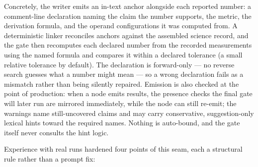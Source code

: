 Concretely, the writer emits an in-text anchor alongside each
reported number: a comment-line declaration naming the claim the
number supports, the metric, the derivation formula, and the operand
configurations it was computed from. A deterministic linker
reconciles anchors against the assembled science record, and the
gate then recomputes each declared number from the recorded
measurements using the named formula and compares it within a
declared tolerance (a small relative tolerance by default). The
declaration is forward-only --- no reverse search guesses what a
number might mean --- so a wrong declaration fails as a mismatch
rather than being silently repaired. Emission is also checked at the
point of production: when a node emits results, the presence checks
the final gate will later run are mirrored immediately, while the
node can still re-emit; the warnings name still-uncovered claims and
may carry conservative, suggestion-only lexical hints toward the
required names. Nothing is auto-bound, and the gate itself never
consults the hint logic.

Experience with real runs hardened four points of this seam, each a
structural rule rather than a prompt fix:

